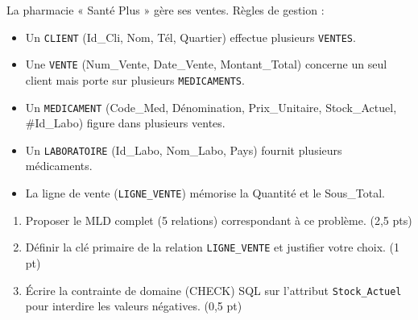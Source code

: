 \documentclass[11pt]{article}
\begin{document}
\begin{exercice}
La pharmacie « Santé Plus » gère ses ventes. Règles de gestion :
\begin{itemize}
    \item Un \texttt{CLIENT} (Id\_Cli, Nom, Tél, Quartier) effectue plusieurs \texttt{VENTES}.
    \item Une \texttt{VENTE} (Num\_Vente, Date\_Vente, Montant\_Total) concerne un seul client mais porte sur plusieurs \texttt{MEDICAMENTS}.
    \item Un \texttt{MEDICAMENT} (Code\_Med, Dénomination, Prix\_Unitaire, Stock\_Actuel, \#Id\_Labo) figure dans plusieurs ventes.
    \item Un \texttt{LABORATOIRE} (Id\_Labo, Nom\_Labo, Pays) fournit plusieurs médicaments.
    \item La ligne de vente (\texttt{LIGNE\_VENTE}) mémorise la Quantité et le Sous\_Total.
\end{itemize}
\begin{enumerate}
    \item Proposer le MLD complet (5 relations) correspondant à ce problème. (2,5 pts)
    \item Définir la clé primaire de la relation \texttt{LIGNE\_VENTE} et justifier votre choix. (1 pt)
    \item Écrire la contrainte de domaine (CHECK) SQL sur l'attribut \texttt{Stock\_Actuel} pour interdire les valeurs négatives. (0,5 pt)
\end{enumerate}
\end{exercice}
\end{document}
